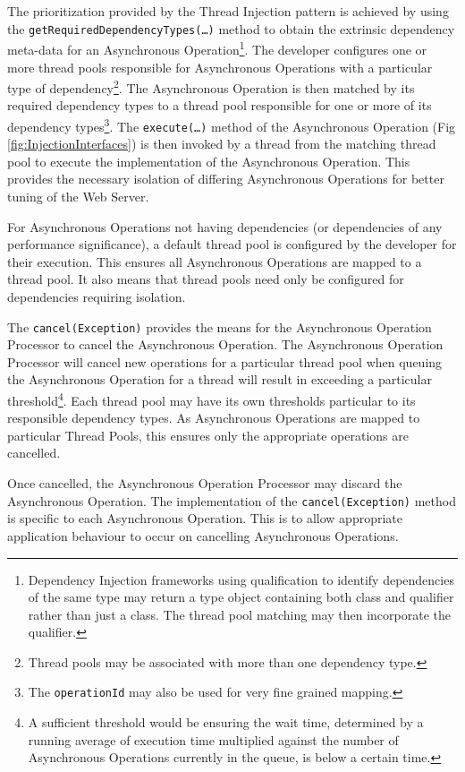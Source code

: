 \documentclass[prodmode]{style/acmlarge}
\begin{document}
The prioritization provided by the Thread Injection pattern is achieved by using
the \texttt{getRequiredDependencyTypes(\ldots)} method to obtain the extrinsic
dependency meta-data for an Asynchronous Operation\footnote{Dependency
Injection frameworks using qualification to identify dependencies of the same
type may return a type object containing both class and qualifier rather than
just a class.  The thread pool matching may then incorporate the qualifier.}.
The developer configures one or more thread pools responsible for Asynchronous
Operations with a particular type of dependency\footnote{Thread pools may be
associated with more than one dependency type.}.  The Asynchronous Operation is
then matched by its required dependency types to a thread pool responsible for
one or more of its dependency types\footnote{The \texttt{operationId} may also
be used for very fine grained mapping.}.  The \texttt{execute(\ldots)} method of
the Asynchronous Operation (Fig \ref{fig:InjectionInterfaces}) is then invoked
by a thread from the matching thread pool to execute the implementation of the
Asynchronous Operation.  This provides the necessary isolation of differing
Asynchronous Operations for better tuning of the Web Server.

For Asynchronous Operations not having dependencies (or dependencies of any
performance significance), a default thread pool is configured by the developer
for their execution.  This ensures all Asynchronous Operations are mapped to a
thread pool.  It also means that thread pools need only be configured for
dependencies requiring isolation.

The \texttt{cancel(Exception)} provides the means for the Asynchronous Operation
Processor to cancel the Asynchronous Operation.  The Asynchronous Operation
Processor will cancel new operations for a particular thread pool when queuing
the Asynchronous Operation for a thread will result in exceeding a particular
threshold\footnote{A sufficient threshold would be ensuring the wait time,
determined by a running average of execution time multiplied against the number
of Asynchronous Operations currently in the queue, is below a certain time.}.
Each thread pool may have its own thresholds particular to its responsible
dependency types.  As Asynchronous Operations are mapped to particular Thread
Pools, this ensures only the appropriate operations are cancelled.

Once cancelled, the Asynchronous Operation Processor may discard the
Asynchronous Operation.  The implementation of the \texttt{cancel(Exception)}
method is specific to each Asynchronous Operation.  This is to allow appropriate
application behaviour to occur on cancelling Asynchronous Operations.
\end{document}
